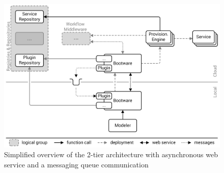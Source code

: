 \begin{figure}[!htbp]
	\centering
	\includegraphics[resolution=600]{design/assets/simple_queue}
	\caption{Simplified overview of the 2-tier architecture with asynchronous web service and a messaging queue communication}
	\label{image:queue}
\end{figure}
